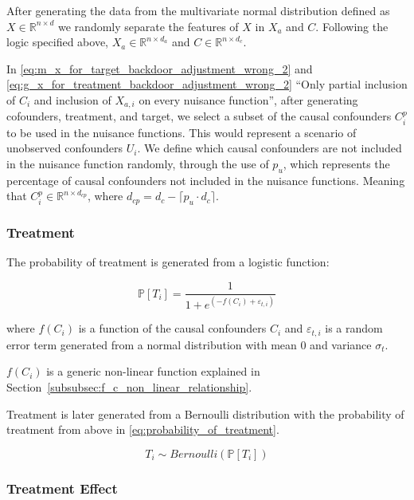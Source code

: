 \documentclass{article}
\numberwithin{equation}{section}
\begin{document}
After generating the data from the multivariate normal distribution defined as $X \in \mathbb{R}^{n \times d}$ we randomly separate the features of $X$ in $X_a$ and $C$. Following the logic specified above, $X_a \in \mathbb{R}^{n \times d_a}$ and $C \in \mathbb{R}^{n \times d_c}$.

In \eqref{eq:m_x_for_target_backdoor_adjustment_wrong_2} and \eqref{eq:g_x_for_treatment_backdoor_adjustment_wrong_2} ``Only partial inclusion of $C_i$ and inclusion of $X_{a, i}$ on every nuisance function'', after generating cofounders, treatment, and target, we select a subset of the causal confounders $C^{p}_i$ to be used in the nuisance functions. This would represent a scenario of unobserved confounders $U_i$. We define which causal confounders are not included in the nuisance function randomly, through the use of $p_u$, which represents the percentage of causal confounders not included in the nuisance functions. Meaning that $C^{p}_i \in \mathbb{R}^{n \times d_{cp}}$, where $d_{cp} = d_c - \lceil p_u \cdot d_c \rceil$.

\subsubsection{Treatment}

The probability of treatment is generated from a logistic function:

\begin{equation}
    \mathbb{P}[T_i] = \frac{1}{1 + e^{(-f(C_i) + \varepsilon_{t, i})}}
    \label{eq:probability_of_treatment}
\end{equation}

where $f(C_i)$ is a function of the causal confounders $C_i$ and $\varepsilon_{t, i}$ is a random error term generated from a normal distribution with mean 0 and variance $\sigma_{t}$.

$f(C_i)$ is a generic non-linear function explained in Section~\ref{subsubsec:f_c_non_linear_relationship}.

Treatment is later generated from a Bernoulli distribution with the probability of treatment from above in \eqref{eq:probability_of_treatment}.

\begin{equation}
    T_i \sim Bernoulli(\mathbb{P}[T_i])
\end{equation}

\subsubsection{Treatment Effect}
\end{document}
